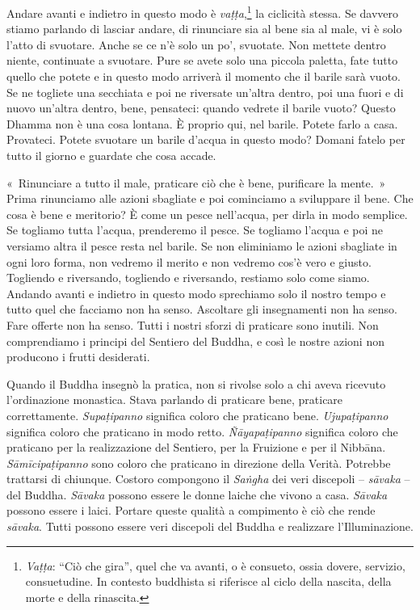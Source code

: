 Andare avanti e indietro in questo modo è \emph{vaṭṭa},\footnote{\emph{Vaṭṭa}:
  ``Ciò che gira'', quel che va avanti, o è consueto, ossia dovere,
  servizio, consuetudine. In contesto buddhista si riferisce al ciclo
  della nascita, della morte e della rinascita.} la ciclicità stessa. Se
davvero stiamo parlando di lasciar andare, di rinunciare sia al bene sia
al male, vi è solo l'atto di svuotare. Anche se ce n'è solo un po',
svuotate. Non mettete dentro niente, continuate a svuotare. Pure se
avete solo una piccola paletta, fate tutto quello che potete e in questo
modo arriverà il momento che il barile sarà vuoto. Se ne togliete una
secchiata e poi ne riversate un'altra dentro, poi una fuori e di nuovo
un'altra dentro, bene, pensateci: quando vedrete il barile vuoto? Questo
Dhamma non è una cosa lontana. È proprio qui, nel barile. Potete farlo a
casa. Provateci. Potete svuotare un barile d'acqua in questo modo?
Domani fatelo per tutto il giorno e guardate che cosa accade.

«~Rinunciare a tutto il male, praticare ciò che è bene, purificare la
mente.~» Prima rinunciamo alle azioni sbagliate e poi cominciamo a
sviluppare il bene. Che cosa è bene e meritorio? È come un pesce
nell'acqua, per dirla in modo semplice. Se togliamo tutta l'acqua,
prenderemo il pesce. Se togliamo l'acqua e poi ne versiamo altra il
pesce resta nel barile. Se non eliminiamo le azioni sbagliate in ogni
loro forma, non vedremo il merito e non vedremo cos'è vero e giusto.
Togliendo e riversando, togliendo e riversando, restiamo solo come
siamo. Andando avanti e indietro in questo modo sprechiamo solo il
nostro tempo e tutto quel che facciamo non ha senso. Ascoltare gli
insegnamenti non ha senso. Fare offerte non ha senso. Tutti i nostri
sforzi di praticare sono inutili. Non comprendiamo i principi del
Sentiero del Buddha, e così le nostre azioni non producono i frutti
desiderati.

Quando il Buddha insegnò la pratica, non si rivolse solo a chi aveva
ricevuto l'ordinazione monastica. Stava parlando di praticare bene,
praticare correttamente. \emph{Supaṭipanno} significa coloro che
praticano bene. \emph{Ujupaṭipanno} significa coloro che praticano in
modo retto. \emph{Ñāyapaṭipanno} significa coloro che praticano per la
realizzazione del Sentiero, per la Fruizione e per il Nibbāna.
\emph{Sāmīcipaṭipanno} sono coloro che praticano in direzione della
Verità. Potrebbe trattarsi di chiunque. Costoro compongono il
\emph{Saṅgha} dei veri discepoli -- \emph{sāvaka} -- del Buddha.
\emph{Sāvaka} possono essere le donne laiche che vivono a casa.
\emph{Sāvaka} possono essere i laici. Portare queste qualità a
compimento è ciò che rende \emph{sāvaka}. Tutti possono essere veri
discepoli del Buddha e realizzare l'Illuminazione.

